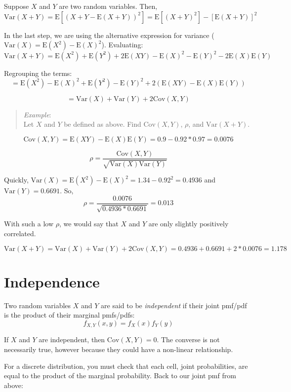 \documentclass[
  letterpaper,
  DIV=11,
  numbers=noendperiod]{scrreprt}
\begin{document}
Suppose \(X\) and \(Y\) are two random variables. Then, \[
\mbox{Var}(X+Y)=\mbox{E}\left[(X+Y-\mbox{E}(X+Y))^2\right]=\mbox{E}[(X+Y)^2]-\left[\mbox{E}(X+Y)\right]^2
\]

In the last step, we are using the alternative expression for variance
(\(\mbox{Var}(X)=\mbox{E}(X^2)-\mbox{E}(X)^2\)). Evaluating: \[
\mbox{Var}(X+Y)=\mbox{E}(X^2)+\mbox{E}(Y^2)+2\mbox{E}(XY)-\mbox{E}(X)^2-\mbox{E}(Y)^2-2\mbox{E}(X)\mbox{E}(Y)
\]

Regrouping the terms: \[
=\mbox{E}(X^2)-\mbox{E}(X)^2+\mbox{E}(Y^2)-\mbox{E}(Y)^2+2\left(\mbox{E}(XY)-\mbox{E}(X)\mbox{E}(Y)\right)
\]

\[
=\mbox{Var}(X)+\mbox{Var}(Y)+2\mbox{Cov}(X,Y)
\]

\begin{quote}
\emph{Example}:\\
Let \(X\) and \(Y\) be defined as above. Find \(\mbox{Cov}(X,Y)\),
\(\rho\), and \(\mbox{Var}(X+Y)\).
\end{quote}

\[
\mbox{Cov}(X,Y)=\mbox{E}(XY)-\mbox{E}(X)\mbox{E}(Y)=0.9-0.92*0.97=0.0076
\]

\[
\rho=\frac{\mbox{Cov}(X,Y)}{\sqrt{\mbox{Var}(X)\mbox{Var}(Y)}}
\]

Quickly,
\(\mbox{Var}(X)=\mbox{E}(X^2)-\mbox{E}(X)^2= 1.34-0.92^2 =0.4936\) and
\(\mbox{Var}(Y)=0.6691\). So, \[
\rho=\frac{0.0076}{\sqrt{0.4936*0.6691}}=0.013
\]

With such a low \(\rho\), we would say that \(X\) and \(Y\) are only
slightly positively correlated.

\[
\mbox{Var}(X+Y)=\mbox{Var}(X)+\mbox{Var}(Y)+2\mbox{Cov}(X,Y)=0.4936+0.6691+2*0.0076=1.178
\]

\section{Independence}\label{independence-1}

Two random variables \(X\) and \(Y\) are said to be \emph{independent}
if their joint pmf/pdf is the product of their marginal pmfs/pdfs: \[
f_{X,Y}(x,y)=f_X(x)f_Y(y)
\]

If \(X\) and \(Y\) are independent, then \(\mbox{Cov}(X,Y) = 0\). The
converse is not necessarily true, however because they could have a
non-linear relationship.

For a discrete distribution, you must check that each cell, joint
probabilities, are equal to the product of the marginal probability.
Back to our joint pmf from above:
\end{document}
